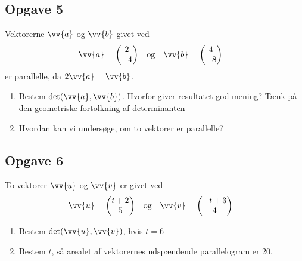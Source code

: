 \subsection*{Opgave 5}
Vektorerne $\vv{a}$ og $\vv{b}$ givet ved
\begin{align*}
	&\vv{a} =	
	\begin{pmatrix}
		2 \\ -4
	\end{pmatrix}
	&
	&\textnormal{og}
	&
	&\vv{b} =
	\begin{pmatrix}
		4 \\ -8
	\end{pmatrix}
\end{align*}
er parallelle, da $2\vv{a} = \vv{b}$.

\begin{enumerate}[label=\roman*)]
	\item Bestem $\det(\vv{a},\vv{b})$. Hvorfor giver resultatet god mening? Tænk på den geometriske fortolkning af determinanten
	\item Hvordan kan vi undersøge, om to vektorer er parallelle?
\end{enumerate} 


\subsection*{Opgave 6}

To vektorer $\vv{u}$ og $\vv{v}$ er givet ved
\begin{align*}
		&\vv{u} =
		\begin{pmatrix}
			t+2 \\ 5
		\end{pmatrix}
		& 
		&\textnormal{og} 
		&
		&\vv{v} =
		\begin{pmatrix}
			-t+3 \\ 4
		\end{pmatrix}
\end{align*}	
\begin{enumerate}[label=\roman*)]
	\item Bestem $\det(\vv{u},\vv{v})$, hvis $t = 6$
	\item Bestem $t$, så arealet af vektorernes udspændende parallelogram er 20.
\end{enumerate}

